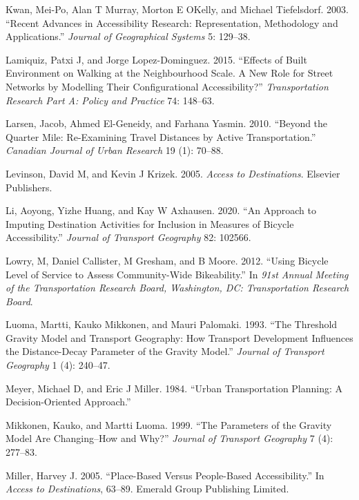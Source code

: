 \documentclass[preprint, 3p,
authoryear]{elsarticle} %
\newlength{\cslhangindent}
\newenvironment{CSLReferences}[2] %
 {\begin{list}{}{%
  \setlength{\itemindent}{0pt}
  \setlength{\leftmargin}{0pt}
  \setlength{\parsep}{0pt}
  \ifodd #1
   \setlength{\leftmargin}{\cslhangindent}
   \setlength{\itemindent}{-1\cslhangindent}
  \fi
  \setlength{\itemsep}{#2\baselineskip}}}
 {\end{list}}
\begin{document}
\begin{CSLReferences}{1}{0}
Kwan, Mei-Po, Alan T Murray, Morton E OKelly, and Michael Tiefelsdorf.
2003. {``Recent Advances in Accessibility Research: Representation,
Methodology and Applications.''} \emph{Journal of Geographical Systems}
5: 129--38.

Lamiquiz, Patxi J, and Jorge Lopez-Dominguez. 2015. {``Effects of Built
Environment on Walking at the Neighbourhood Scale. A New Role for Street
Networks by Modelling Their Configurational Accessibility?''}
\emph{Transportation Research Part A: Policy and Practice} 74: 148--63.

Larsen, Jacob, Ahmed El-Geneidy, and Farhana Yasmin. 2010. {``Beyond the
Quarter Mile: Re-Examining Travel Distances by Active Transportation.''}
\emph{Canadian Journal of Urban Research} 19 (1): 70--88.

Levinson, David M, and Kevin J Krizek. 2005. \emph{Access to
Destinations}. Elsevier Publishers.

Li, Aoyong, Yizhe Huang, and Kay W Axhausen. 2020. {``An Approach to
Imputing Destination Activities for Inclusion in Measures of Bicycle
Accessibility.''} \emph{Journal of Transport Geography} 82: 102566.

Lowry, M, Daniel Callister, M Gresham, and B Moore. 2012. {``Using
Bicycle Level of Service to Assess Community-Wide Bikeability.''} In
\emph{91st Annual Meeting of the Transportation Research Board,
Washington, DC: Transportation Research Board}.

Luoma, Martti, Kauko Mikkonen, and Mauri Palomaki. 1993. {``The
Threshold Gravity Model and Transport Geography: How Transport
Development Influences the Distance-Decay Parameter of the Gravity
Model.''} \emph{Journal of Transport Geography} 1 (4): 240--47.

Meyer, Michael D, and Eric J Miller. 1984. {``Urban Transportation
Planning: A Decision-Oriented Approach.''}

Mikkonen, Kauko, and Martti Luoma. 1999. {``The Parameters of the
Gravity Model Are Changing--How and Why?''} \emph{Journal of Transport
Geography} 7 (4): 277--83.

Miller, Harvey J. 2005. {``Place-Based Versus People-Based
Accessibility.''} In \emph{Access to Destinations}, 63--89. Emerald
Group Publishing Limited.


\end{CSLReferences}
\end{document}
